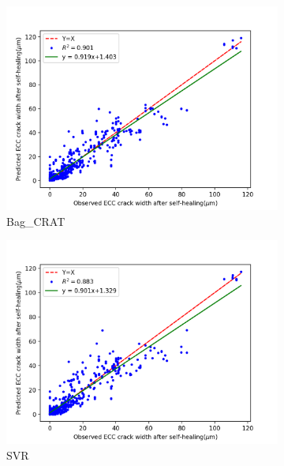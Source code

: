 \documentclass[11pt]{article}
\begin{document}
\begin{figure}[!h]
\begin{subfigure}{.35\textwidth}
			\includegraphics[width = \linewidth]{02Bag_CRAT.png}
			\caption{Bag\_CRAT}
		    \end{subfigure}%
		\hspace{-1.4em}
		    \begin{subfigure}{0.35\textwidth}
		    \centering
		    \includegraphics[width = \linewidth]{02SVR.png}
		    \caption{SVR}
		    \end{subfigure}%
		\hspace{-1.4em}
	    	\begin{subfigure}{.35\textwidth}
			\centering

\end{subfigure}
\end{figure}
\end{document}
